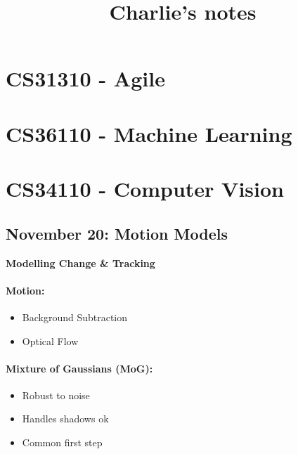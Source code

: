 \documentclass[paper=a4, fontsize=11pt]{article} %
\numberwithin{equation}{section} %
\numberwithin{figure}{section} %
\numberwithin{table}{section} %
\begin{document}
\title{Charlie's notes}

\maketitle

\section{CS31310 - Agile}





\section{CS36110 - Machine Learning}



\section{CS34110 - Computer Vision}

\subsection{November 20: Motion Models}

\textbf{Modelling Change \& Tracking}

\paragraph{Motion:}
\begin{itemize}
\item Background Subtraction
\item Optical Flow
\end{itemize}

\paragraph{Mixture of Gaussians (MoG):}
\begin{itemize}
\item Robust to noise
\item Handles shadows ok
\item Common first step
\end{itemize}
\end{document}

